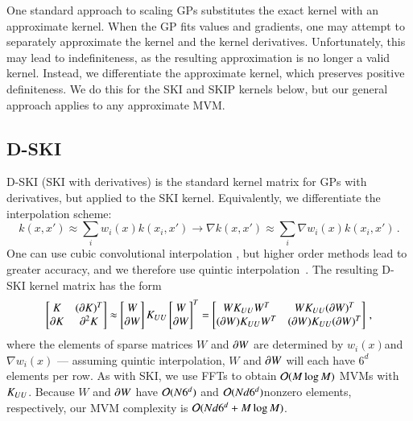 One standard approach to scaling GPs substitutes the exact kernel with an
approximate kernel. When the GP fits values and gradients, one may attempt to
separately approximate the kernel and the kernel derivatives. Unfortunately,
this may lead to indefiniteness, as the resulting approximation is no longer a
valid kernel. Instead, we differentiate the approximate kernel, which preserves
positive definiteness. We do this for the SKI and SKIP kernels below, but our
general approach applies to any approximate MVM.

\subsection{D-SKI}

D\hyp{}SKI (SKI with derivatives) is the standard kernel matrix for GPs with
derivatives, but applied to the SKI kernel.  Equivalently, we differentiate the
interpolation scheme:
\begin{equation}\label{eqn:weightderiv}
  k(x,x') \approx \sum_i w_i(x)k(x_i,x')\rightarrow \nabla k(x,x') \approx
  \sum_i \nabla w_i(x) k(x_i,x')\,.
\end{equation}
One can use cubic convolutional interpolation \citep{keys1981cubic}, but higher
order methods lead to greater accuracy, and we therefore use quintic
interpolation~\cite{meijering1999image}.  The resulting D\hyp{}SKI kernel matrix
has the form
\begin{equation}\label{eqn:dski}
  \begin{bmatrix} K & (\dx K)^T \\ \dx K & \ddx K \end{bmatrix}  \approx
  \begin{bmatrix} W \\ \dx W  \end{bmatrix}  K_{UU}
  \begin{bmatrix} W \\ \dx W  \end{bmatrix} ^T =
  \begin{bmatrix} W\K{UU}W^T & W\K{UU} (\dx W)^T \\
  (\dx W) \K{UU} W^T & (\dx W) \K{UU} (\dx W)^T  \end{bmatrix}\,,
\end{equation}
where the elements of sparse matrices $W$ and  $\operatorname{\partial\!} W$ are determined by $w_i
(x)$and $\nabla w_i(x)$ --- assuming quintic interpolation, $W$ and $\operatorname{\partial\!} W$ will
each have $6^d$ elements per row. As with SKI, we use FFTs to obtain $
\mathcal{O}(M \log M)$ MVMs with $K_{UU}$. Because $W$ and $\operatorname{\partial\!} W$ have $\mathcal{O}(N6^d)$
and $\mathcal{O}(Nd6^d)$nonzero elements, respectively, our MVM complexity is $\mathcal{O}
(Nd6^d + M \log M)$.

